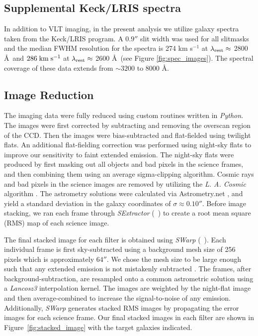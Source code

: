 \documentclass[twocolumn]{aastex62}
\newcommand{\citeth}[1]{(\citeauthor{#1}\ \citeyear{#1})}
\def \mkms {{\rm \; km\;s^{-1}}}
\begin{document}
\subsection{Supplemental Keck/LRIS spectra}
In addition to VLT imaging, in the present analysis we utilize galaxy spectra taken from the \cite{Rubin_2014} Keck/LRIS program.  A $0.9''$ slit width was used for all slitmasks and the median FWHM resolution for the spectra is 274 km s$^{-1}$ at $\lambda_{\rm rest} \approx$ 2800 \AA\ and $286\mkms$  at $\lambda_{\rm rest}\approx$ 2600 \AA\ (see Figure \ref{fig:spec_images}).  The spectral coverage of these data extends from ${\sim}3200$ to 8000 \AA.

\subsection{Image Reduction}
The imaging data were fully reduced using custom routines written in \emph{Python}. 
The images were first corrected by subtracting and removing the overscan region of the CCD. 
Then the images were bias-subtracted and flat-fielded using twilight flats.
An additional flat-fielding correction was performed using night-sky flats to improve our sensitivity to faint extended emission.  The night-sky flats were produced by first masking out all objects and bad pixels in the science frames, and then combining them using an average sigma-clipping algorithm.
Cosmic rays and bad pixels in the science images are removed by utilizing the \emph{L. A. Cosmic} algorithm \citep{Dokkum2001}.
The astrometry solutions were calculated via Astrometry.net \citep{Lang}, and yield a standard deviation in the galaxy coordinates of $\sigma \approx 0.10''$. Before image stacking, we ran each frame through \emph{SExtractor} \citeth{Bertin} to create a root mean square (RMS) map of each science image.


The final stacked image for each filter is obtained using \emph{SWarp} \citeth{Bertin}.
Each individual frame is first sky-subtracted using a background mesh size of 256 pixels which is approximately $64''$. 
We chose the mesh size to be large enough such that any extended emission is not mistakenly subtracted \citep[e.g.,][]{Battaia_2015}. 
The frames, after background-subtraction, are resampled onto a common astrometric solution using a \textit{Lancosz3} interpolation kernel. 
The images are weighted by the night-flat image and then  average-combined to increase the signal-to-noise of any  emission. Additionally, \emph{SWarp} generates stacked RMS images by propagating the error images for each science frame.
Our final stacked images in each filter are shown in Figure~\ref{fig:stacked_image} with the target galaxies indicated.  
\end{document}
